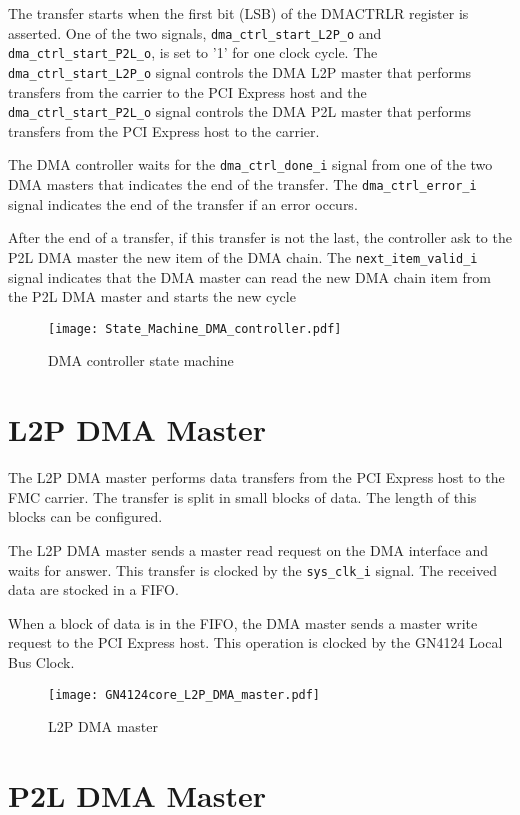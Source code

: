 \documentclass[10pt,a4paper]{cerndoc}
\begin{document}
The transfer starts when the first bit (LSB) of the DMACTRLR register is asserted. One of the two signals, \verb+dma_ctrl_start_L2P_o+ and \verb+dma_ctrl_start_P2L_o+, is set to '1' for one clock cycle. The \verb+dma_ctrl_start_L2P_o+ signal controls the DMA L2P master that performs transfers from the carrier to the PCI Express host and the \verb+dma_ctrl_start_P2L_o+ signal controls the DMA P2L master that performs transfers from the PCI Express host to the carrier.

The DMA controller waits for the \verb+dma_ctrl_done_i+ signal from one of the two DMA masters that indicates the end of the transfer. The \verb+dma_ctrl_error_i+ signal indicates the end of the transfer if an error occurs.

After the end of a transfer, if this transfer is not the last, the controller ask to the P2L DMA master the new item of the DMA chain. The \verb+next_item_valid_i+ signal indicates that the DMA master can read the new DMA chain item from the P2L DMA master and starts the new cycle


\begin{figure}[!ht]
	\centering
		\texttt{[image: State\_Machine\_DMA\_controller.pdf]}
	\caption{DMA controller state machine}
	\label{fig:GN4124core_dma_ctrl_state_machine}
\end{figure}

  \section{L2P DMA Master}
The L2P DMA master performs data transfers from the PCI Express host to the FMC carrier. The transfer is split in small blocks of data. The length of this blocks can be configured.

The L2P DMA master sends a master read request on the DMA interface and waits for answer. This transfer is clocked by the \verb+sys_clk_i+ signal. The received data are stocked in a FIFO. 

When a block of data is in the FIFO, the DMA master sends a master write request to the PCI Express host. This operation is clocked by the GN4124 Local Bus Clock.
  

\begin{figure}[!ht]
	\centering
		\texttt{[image: GN4124core\_L2P\_DMA\_master.pdf]}
	\caption{L2P DMA master}
	\label{fig:GN4124core_l2p_dma_master}
\end{figure}


 \section{P2L DMA Master}
 
\end{document}

